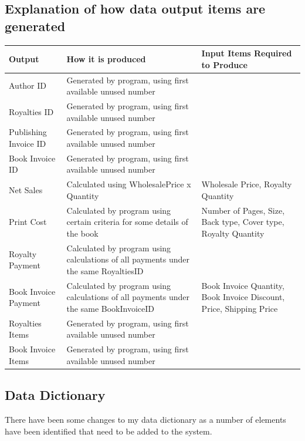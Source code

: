 \subsection{Explanation of how data output items are generated}

\begin{center}
\begin{tabular}{|p{3cm}|p{4cm}|p{3cm}|}
    \hline
    \textbf{Output} & \textbf{How it is produced} & \textbf{Input Items Required to Produce} \\ \hline
    Author ID & Generated by program, using first available unused number & \\ \hline
    Royalties ID & Generated by program, using first available unused number & \\ \hline
    Publishing Invoice ID & Generated by program, using first available unused number & \\ \hline
    Book Invoice ID & Generated by program, using first available unused number & \\ \hline
    Net Sales & Calculated using WholesalePrice x Quantity & Wholesale Price, Royalty Quantity \\ \hline
    Print Cost & Calculated by program using certain criteria for some details of the book & Number of Pages, Size, Back type, Cover type, Royalty Quantity \\ \hline
    Royalty Payment & Calculated by program using calculations of all payments under the same RoyaltiesID & \\ \hline
    Book Invoice Payment & Calculated by program using calculations of all payments under the same BookInvoiceID & Book Invoice Quantity, Book Invoice Discount, Price, Shipping Price \\ \hline
    Royalties Items &  Generated by program, using first available unused number & \\ \hline
    Book Invoice Items &  Generated by program, using first available unused number & \\ \hline
\end{tabular}
\end{center}


\subsection{Data Dictionary}

There have been some changes to my data dictionary as a number of elements have been identified that need to be added to the system.

